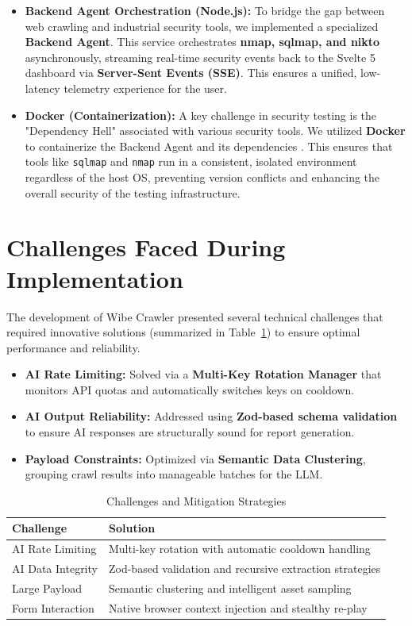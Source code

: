 \documentclass[12pt,oneside,a4paper]{book}
\begin{document}
\begin{itemize}
    \item \textbf{Backend Agent Orchestration (Node.js):} To bridge the gap between web crawling and industrial security tools, we implemented a specialized \textbf{Backend Agent}. This service orchestrates \textbf{nmap, sqlmap, and nikto} asynchronously, streaming real-time security events back to the Svelte 5 dashboard via \textbf{Server-Sent Events (SSE)}. This ensures a unified, low-latency telemetry experience for the user.

    \item \textbf{Docker (Containerization):} A key challenge in security testing is the "Dependency Hell" associated with various security tools. We utilized \textbf{Docker} to containerize the Backend Agent and its dependencies \cite{docker2025}. This ensures that tools like \texttt{sqlmap} and \texttt{nmap} run in a consistent, isolated environment regardless of the host OS, preventing version conflicts and enhancing the overall security of the testing infrastructure.
    
\end{itemize}

\section{Challenges Faced During Implementation}

The development of Wibe Crawler presented several technical challenges that required innovative solutions (summarized in Table~\ref{tab:challenges}) to ensure optimal performance and reliability.

\begin{itemize}
  \item \textbf{AI Rate Limiting:} Solved via a \textbf{Multi-Key Rotation Manager} that monitors API quotas and automatically switches keys on cooldown.
  \item \textbf{AI Output Reliability:} Addressed using \textbf{Zod-based schema validation} to ensure AI responses are structurally sound for report generation.
  \item \textbf{Payload Constraints:} Optimized via \textbf{Semantic Data Clustering}, grouping crawl results into manageable batches for the LLM.
\end{itemize}

\begin{table}[ht]
\centering
\caption{Challenges and Mitigation Strategies}
\label{tab:challenges}
\begin{tabular}{|l|p{6cm}|}
\hline
\textbf{Challenge} & \textbf{Solution} \\
\hline
AI Rate Limiting & Multi-key rotation with automatic cooldown handling \\
\hline
AI Data Integrity & Zod-based validation and recursive extraction strategies \\
\hline
Large Payload & Semantic clustering and intelligent asset sampling \\
\hline
Form Interaction & Native browser context injection and stealthy re-play \\
\hline
\end{tabular}
\end{table}
\end{document}
